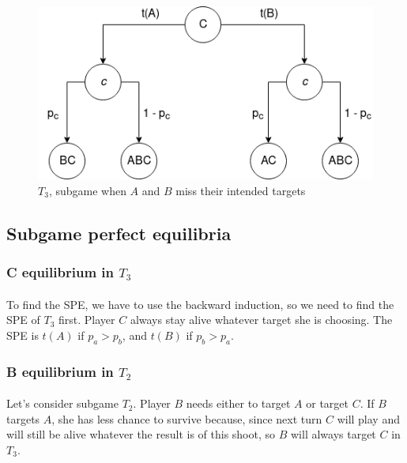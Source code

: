 \documentclass[letterpaper]{article}
\begin{document}
\begin{figure}[!ht]
 \centerline{\includegraphics[scale=0.5]{images/T3}}
 \caption{$T_3$, subgame when $A$ and $B$ miss their intended targets}
 \label{fig:t3}
\end{figure}

\subsection{Subgame perfect equilibria}

\subsubsection{C equilibrium in $T_3$}
\paragraph{}

To find the SPE, we have to use the backward induction, so we need to find
the SPE of $T_3$ first. Player $C$ always stay alive whatever target she is
choosing. The SPE is $t(A)$ if $p_a > p_b$, and $t(B)$ if $p_b > p_a$.

\subsubsection{B equilibrium in $T_2$}

\paragraph{}

Let's consider subgame $T_2$. Player $B$ needs either to target $A$
or target $C$. If $B$ targets $A$, she has less chance to survive because,
since next turn $C$ will play and will still be alive whatever the result is
of this shoot, so $B$ will always target $C$ in $T_3$.
\end{document}
